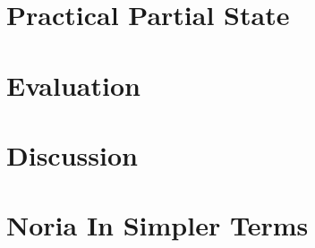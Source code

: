 \documentclass[fontsize=12pt,paper=letter,draft=true]{scrbook}
\begin{document}
\chapter{Practical Partial State}

\chapter{Evaluation}



\chapter{Discussion}

\appendix
\chapter{Noria In Simpler Terms}

\backmatter

\begin{spacing}{1}
\printbibliography
\end{spacing}
\end{document}

